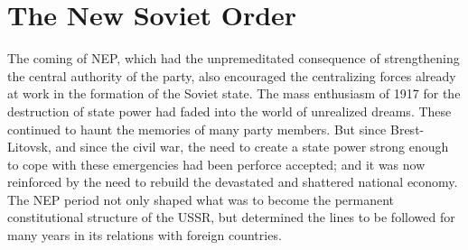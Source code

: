 \chapter{The New Soviet Order}

The coming of NEP, which had the unpremeditated consequence of strengthening the central authority of the party, also encouraged the centralizing forces already at work in the formation of the Soviet state. The mass enthusiasm of 1917 for the destruction of state power had faded into the world of unrealized dreams. These continued to haunt the memories of many party members. But since Brest-Litovsk, and since the civil war, the need to create a state power strong enough to cope with these emergencies had been perforce accepted; and it was now reinforced by the need to rebuild the devastated and shattered national economy. The NEP period not only shaped what was to become the permanent constitutional structure of the USSR, but determined the lines to be followed for many years in its relations with foreign countries. 

